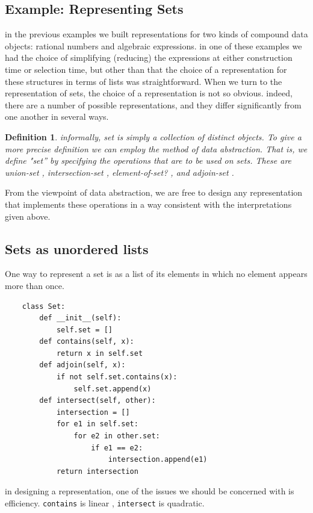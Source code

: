 \documentclass[a4paper,twoside]{article}
\newtheorem{definition}[theorem]{Definition}
\numberwithin{equation}{section}
\begin{document}
\subsection{Example: Representing Sets}
in the previous examples we built representations for two kinds of compound data objects: rational numbers and algebraic expressions. in one of these examples we had the choice of simplifying (reducing) the expressions at either construction time or selection time, but other than that the choice of a representation for these structures in terms of lists was straightforward. When we turn to the representation of sets, the choice of a representation is not so obvious. indeed, there are a number of possible representations, and they differ significantly from one another in several ways.
\begin{definition}
    informally, set is simply a collection of distinct objects. To give a more precise definition we can employ the method of data abstraction. That is, we define "set” by specifying the operations that are to be used on sets. These are union-set , intersection-set , element-of-set? , and adjoin-set .
\end{definition}
From the viewpoint of data abstraction, we are free to design any representation that implements these operations in a way consistent with the interpretations given above.
\subsection{Sets as unordered lists}
One way to represent a set is as a list of its elements in which no element appears more than once.
\begin{lstlisting}
    class Set:
        def __init__(self):
            self.set = []
        def contains(self, x):
            return x in self.set
        def adjoin(self, x):
            if not self.set.contains(x):
                self.set.append(x)
        def intersect(self, other):
            intersection = []
            for e1 in self.set:
                for e2 in other.set:
                    if e1 == e2:
                        intersection.append(e1)
            return intersection
\end{lstlisting}
in designing a representation, one of the issues we should be concerned
with is eﬃciency.
\texttt{contains} is linear , \texttt{intersect} is quadratic.
\end{document}
